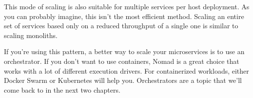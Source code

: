 
This mode of scaling is also suitable for multiple services per host deployment. As you can probably imagine, this isn't the most efficient method. Scaling an entire set of services based only on a reduced throughput of a single one is similar to scaling monoliths.

If you're using this pattern, a better way to scale your microservices is to use an orchestrator. If you don't want to use containers, Nomad is a great choice that works with a lot of different execution drivers. For containerized workloads, either Docker Swarm or Kubernetes will help you. Orchestrators are a topic that we'll come back to in the next two chapters.





